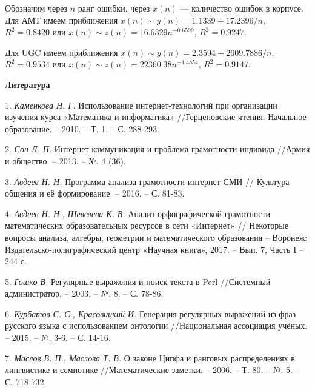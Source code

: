 Обозначим через $n$ ранг ошибки, через $x(n)$ --- количество ошибок в корпусе.
Для АМТ имеем приближения
$x(n) \sim y(n) = 1.1339+{17.2396}/{n}$, $R^2 = 0.8420$ или
$x(n) \sim z(n) = 16.6329n^{-0.6599}      $, $R^2 = 0.9247$.

Для UGC имеем приближения
$x(n) \sim y(n) = 2.3594+{2609.7886}/{n}$, $R^2 = 0.9534$ или
$x(n) \sim z(n) = 22360.38n^{-1.4854}         $, $R^2 = 0.9147$.

\smallskip \centerline{\bf Литература}\nopagebreak

1. {\it Каменкова Н. Г. } Использование интернет-технологий при организации изучения курса «Математика и информатика» //Герценовские чтения. Начальное образование. – 2010. – Т. 1. – С. 288-293.

2. {\it Сон Л. П.} Интернет коммуникация и проблема грамотности индивида //Армия и общество. – 2013. – №. 4 (36).

3. {\it Авдеев Н. Н.} Программа анализа грамотности интер\-нет\--СМИ // Культура общения и её формирование. – 2016. – С. 81-83.

4. {\it Авдеев Н. Н., Шевелева К. В.} Анализ орфографической грамотности
математических образовательных ресурсов в сети «Интернет» // Некоторые вопросы анализа, алгебры, геометрии и математического
образования – Воронеж: Издательско-полиграфический центр «Научная книга», 2017. – Вып. 7, Часть I – 244 с.

5. \textit{Гошко В.} Регулярные выражения и поиск текста в Perl //Системный администратор. – 2003. – №. 8. – С. 78-86.

6. \textit{Курбатов С. С., Красовицкий И.}
Генерация регулярных выражений из фраз русского языка с использованием онтологии //Национальная ассоциация учёных. – 2015. – №. 3-6. – С. 14-16.

7. \textit{Маслов В. П., Маслова Т. В.} О законе Ципфа и ранговых распределениях в лингвистике и семиотике //Математические заметки. – 2006. – Т. 80. – №. 5. – С. 718-732.

